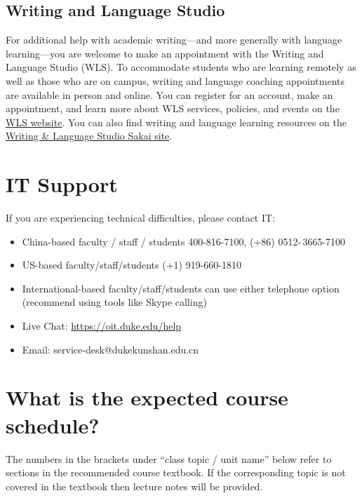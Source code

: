 \documentclass[11pt]{article}
\begin{document}
\subsection{Writing and Language Studio}

For additional help with academic writing---and more generally with language learning---you are welcome to make an appointment with the Writing and Language Studio (WLS). To accommodate students who are learning remotely as well as those who are on campus, writing and language coaching appointments are available in person and online. You can register for an account, make an appointment, and learn more about WLS services, policies, and events on the \href{https://dukekunshan.edu.cn/en/academics/language-and-culture-center/writing-and-language-studio}{WLS website}. You can also find writing and language learning resources on the \href{https://sakai.duke.edu/x/mQ6xqG}{Writing \& Language Studio Sakai site}.



\section{IT Support}

If you are experiencing technical difficulties, please contact IT:
\begin{itemize}[label={-},noitemsep]
\item China-based faculty / staff / students 400-816-7100, (+86) 0512- 3665-7100
\item US-based faculty/staff/students (+1) 919-660-1810
\item International-based faculty/staff/students can use either telephone option (recommend using tools like Skype calling)
\item Live Chat:  \url{https://oit.duke.edu/help}
\item Email:  service-desk@dukekunshan.edu.cn
\end{itemize}



\section{What is the expected course schedule?}

The numbers in the brackets under ``class topic / unit name'' below refer to sections in the recommended course textbook. If the corresponding topic is not covered in the textbook then lecture notes will be provided.
\end{document}
